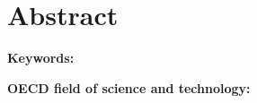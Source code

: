 \section*{Abstract}

\vspace{1cm}
\noindent
\textbf{Keywords:} 


\vspace{1cm}
\noindent
\textbf{OECD field of science and technology:} 
